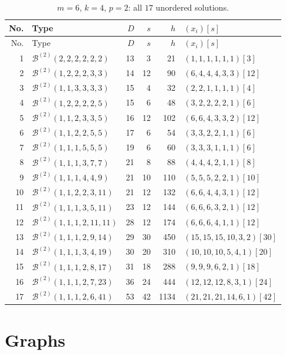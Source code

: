 \documentclass[11pt,a4paper]{article}
\newcommand{\Ber}{\mathcal B}
\theoremstyle{definition}
\theoremstyle{plain}
\begin{document}
\begin{longtable}{@{}r l r r r l@{}}
\caption{$m=6$, $k=4$, $p=2$: all $17$ unordered solutions.}\label{tab:m6p2}\\
\toprule
No. & Type & $D$ & $s$ & $h$ & $(x_i)[s]$\\
\midrule
\endfirsthead
\toprule
No. & Type & $D$ & $s$ & $h$ & $(x_i)[s]$\\
\midrule
\endhead
1 & $\Ber^{(2)}(2,2,2,2,2,2)$ & 13 & 3 & 21 & $(1,1,1,1,1,1)[3]$ \\
2 & $\Ber^{(2)}(1,2,2,2,3,3)$ & 14 & 12 & 90 & $(6,4,4,4,3,3)[12]$ \\
3 & $\Ber^{(2)}(1,1,3,3,3,3)$ & 15 & 4 & 32 & $(2,2,1,1,1,1)[4]$ \\
4 & $\Ber^{(2)}(1,2,2,2,2,5)$ & 15 & 6 & 48 & $(3,2,2,2,2,1)[6]$ \\
5 & $\Ber^{(2)}(1,1,2,3,3,5)$ & 16 & 12 & 102 & $(6,6,4,3,3,2)[12]$ \\
6 & $\Ber^{(2)}(1,1,2,2,5,5)$ & 17 & 6 & 54 & $(3,3,2,2,1,1)[6]$ \\
7 & $\Ber^{(2)}(1,1,1,5,5,5)$ & 19 & 6 & 60 & $(3,3,3,1,1,1)[6]$ \\
8 & $\Ber^{(2)}(1,1,1,3,7,7)$ & 21 & 8 & 88 & $(4,4,4,2,1,1)[8]$ \\
9 & $\Ber^{(2)}(1,1,1,4,4,9)$ & 21 & 10 & 110 & $(5,5,5,2,2,1)[10]$ \\
10 & $\Ber^{(2)}(1,1,2,2,3,11)$ & 21 & 12 & 132 & $(6,6,4,4,3,1)[12]$ \\
11 & $\Ber^{(2)}(1,1,1,3,5,11)$ & 23 & 12 & 144 & $(6,6,6,3,2,1)[12]$ \\
12 & $\Ber^{(2)}(1,1,1,2,11,11)$ & 28 & 12 & 174 & $(6,6,6,4,1,1)[12]$ \\
13 & $\Ber^{(2)}(1,1,1,2,9,14)$ & 29 & 30 & 450 & $(15,15,15,10,3,2)[30]$ \\
14 & $\Ber^{(2)}(1,1,1,3,4,19)$ & 30 & 20 & 310 & $(10,10,10,5,4,1)[20]$ \\
15 & $\Ber^{(2)}(1,1,1,2,8,17)$ & 31 & 18 & 288 & $(9,9,9,6,2,1)[18]$ \\
16 & $\Ber^{(2)}(1,1,1,2,7,23)$ & 36 & 24 & 444 & $(12,12,12,8,3,1)[24]$ \\
17 & $\Ber^{(2)}(1,1,1,2,6,41)$ & 53 & 42 & 1134 & $(21,21,21,14,6,1)[42]$ \\
\bottomrule
\end{longtable}
\section{Graphs}
\end{document}
